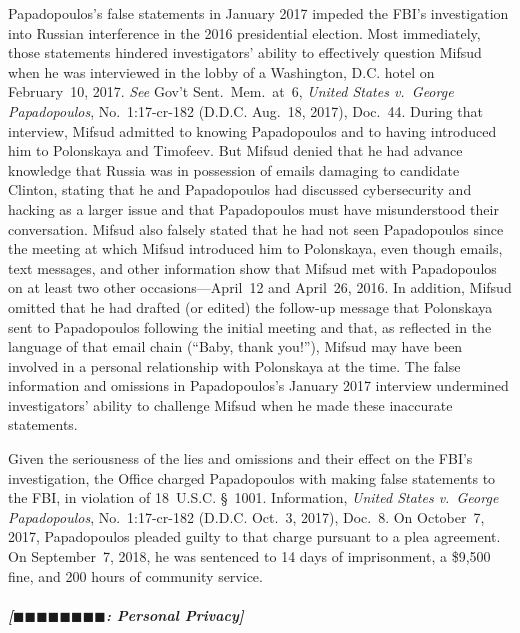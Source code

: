 Papadopoulos's false statements in January 2017 impeded the FBI's investigation into Russian interference in the 2016 presidential election.
Most immediately, those statements hindered investigators' ability to effectively question Mifsud when he was interviewed in the lobby of a Washington, D.C. hotel on February~10, 2017.
\textit{See} Gov't Sent.~Mem.\ at~6, \textit{United States v.\ George Papadopoulos}, No.~1:17-cr-182 (D.D.C. Aug.~18, 2017), Doc.~44.
During that interview, Mifsud admitted to knowing Papadopoulos and to having introduced him to Polonskaya and Timofeev.
But Mifsud denied that he had advance knowledge that Russia was in possession of emails damaging to candidate Clinton, stating that he and Papadopoulos had discussed cybersecurity and hacking as a larger issue and that Papadopoulos must have misunderstood their conversation.
Mifsud also falsely stated that he had not seen Papadopoulos since the meeting at which Mifsud introduced him to Polonskaya, even though emails, text messages, and other information show that Mifsud met with Papadopoulos on at least two other occasions---April~12 and April~26, 2016.
In addition, Mifsud omitted that he had drafted (or edited) the follow-up message that Polonskaya sent to Papadopoulos following the initial meeting and that, as reflected in the language of that email chain (``Baby, thank you!''), Mifsud may have been involved in a personal relationship with Polonskaya at the time.
The false information and omissions in Papadopoulos's January 2017 interview undermined investigators' ability to challenge Mifsud when he made these inaccurate statements.

Given the seriousness of the lies and omissions and their effect on the FBI's investigation, the Office charged Papadopoulos with making false statements to the FBI, in violation of 18~U.S.C. \S~1001.
Information, \textit{United States v.\ George Papadopoulos}, No.~1:17-cr-182 (D.D.C. Oct.~3, 2017), Doc.~8.
On October~7, 2017, Papadopoulos pleaded guilty to that charge pursuant to a plea agreement.
On September~7, 2018, he was sentenced to 14 days of imprisonment, a \$9,500 fine, and 200 hours of community service.

\subparagraph{[$\blacksquare\blacksquare\blacksquare\blacksquare\blacksquare\blacksquare\blacksquare\blacksquare$: Personal Privacy]}


